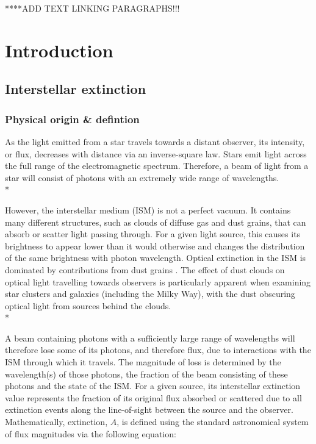 \documentclass[12pt, a4paper]{report}
\begin{document}
****ADD TEXT LINKING PARAGRAPHS!!!

\chapter{Introduction}
\section{Interstellar extinction} \label{ext_def}
\subsection{Physical origin \& defintion} \label{phys_origin}
As the light emitted from a star travels towards a distant observer, its intensity, or flux, decreases with distance via an inverse-square law. Stars emit light across the full range of the electromagnetic spectrum. Therefore, a beam of light from a star will consist of photons with an extremely wide range of wavelengths. \\*

However, the interstellar medium (ISM) is not a perfect vacuum. It contains many different structures, such as clouds of diffuse gas and dust grains, that can absorb or scatter light passing through. For a given light source, this causes its brightness to appear lower than it would otherwise and changes the distribution of the same brightness with photon wavelength. Optical extinction in the ISM is dominated by contributions from dust grains \citep{2016Ap.....59..548G}. The effect of dust clouds on optical light travelling towards observers is particularly apparent when examining star clusters and galaxies (including the Milky Way), with the dust obscuring optical light from sources behind the clouds. \\*

A beam containing photons with a sufficiently large range of wavelengths will therefore lose some of its photons, and therefore flux, due to interactions with the ISM through which it travels. The magnitude of loss is determined by the wavelength(s) of those photons, the fraction of the beam consisting of these photons and the state of the ISM. For a given source, its interstellar extinction value represents the fraction of its original flux absorbed or scattered due to all extinction events along the line-of-sight between the source and the observer. Mathematically, extinction, $A$, is defined using the standard astronomical system of flux magnitudes via the following equation:
\end{document}
